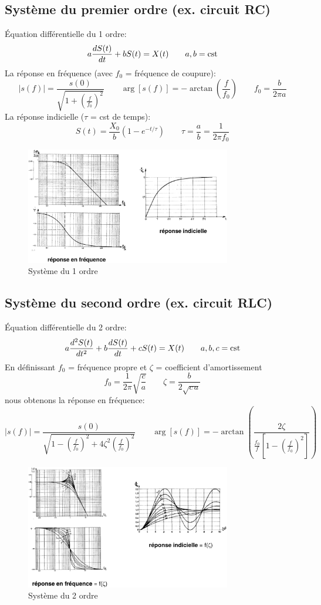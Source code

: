 \subsection{Système du premier ordre (ex. circuit RC)}
Équation différentielle du 1 ordre:
\[
a\frac{d S(t)}{dt} + b S(t) = X(t)\qquad a, b=\cst
\]
La réponse en fréquence (avec \(f_0\) = fréquence de coupure):
\[
|s(f)|=\frac{s(0)}{\sqrt{1+\left(\frac{f}{f_0}\right)^2}}\qquad \arg[s(f)] = -\arctan\left(\frac{f}{f_0}\right)\qquad f_0=\frac{b}{2\pi a}
\]
La réponse indicielle (\(\tau\) = cst de temps):
\[
S(t) = \frac{X_0}{b}\left(1-e^{-t/\tau}\right)\qquad \tau =\frac{a}{b}=\frac{1}{2\pi f_0}
\]
\begin{figure}[H] 
	\centering 
	\includegraphics[width=0.8\textwidth]{ch2/image10} 
	\caption{Système du 1 ordre} 
\end{figure}
\subsection{Système du second ordre (ex. circuit RLC)}
Équation différentielle du 2 ordre:
\[
a\frac{d^2 S(t)}{dt^2} + b \frac{d S(t)}{dt} + cS(t) = X(t)\qquad a,b,c=\cst
\]
En définissant \(f_0\) = fréquence propre et \(\zeta\) = coefficient d'amortissement
\[
f_0 = \frac{1}{2\pi}\sqrt{\frac{c}{a}}\qquad \zeta=\frac{b}{2\sqrt{c\,a}}
\]
nous obtenons la réponse en fréquence:
\[
|s(f)|=\frac{s(0)}{\sqrt{1-\left(\frac{f}{f_0}\right)^2+4\zeta^2\left(\frac{f}{f_0}\right)^2}}\qquad \arg[s(f)] = -\arctan\left(\frac{2\zeta}{\frac{f_0}{f}\left[1-\left(\frac{f}{f_0}\right)^2\right]}\right)
\]

\begin{figure}[H] 
	\centering 
	\includegraphics[width=0.8\textwidth]{ch2/image11} 
	\caption{Système du 2 ordre} 
\end{figure}
